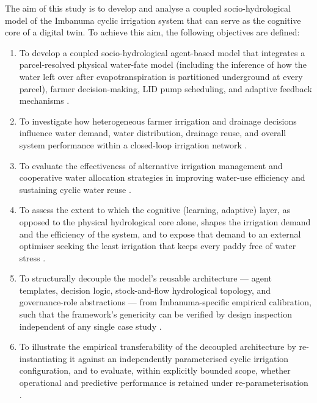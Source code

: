 \documentclass{article}
\begin{document}
\begin{changed}
The aim of this study is to develop and analyse a coupled socio-hydrological model of the Imbanuma cyclic irrigation system \cite{Okura2025WaterBalance} that can serve as the cognitive core of a digital twin. To achieve this aim, the following objectives are defined:

\begin{enumerate}
    \item To develop a coupled socio-hydrological agent-based model that integrates a parcel-resolved physical water-fate model (including the inference of how the water left over after evapotranspiration is partitioned underground at every parcel), farmer decision-making, LID pump scheduling, and adaptive feedback mechanisms \cite{Tao2019DigitalTwin, Rasheed2020DigitalTwin}.
    \item To investigate how heterogeneous farmer irrigation and drainage decisions influence water demand, water distribution, drainage reuse, and overall system performance within a closed-loop irrigation network \cite{Takeda2001Cyclic, Maruyama2008, Cao2017}.
    \item To evaluate the effectiveness of alternative irrigation management and cooperative water allocation strategies in improving water-use efficiency and sustaining cyclic water reuse \cite{Cao2017, OkuraBudiasaKato2022, Bahrami2022}.
    \item To assess the extent to which the cognitive (learning, adaptive) layer, as opposed to the physical hydrological core alone, shapes the irrigation demand and the efficiency of the system, and to expose that demand to an external optimiser seeking the least irrigation that keeps every paddy free of water stress \cite{Tao2021DigitalTwin, Verdouw2021AgricultureDT}.
    \item To structurally decouple the model's reusable architecture --- agent templates, decision logic, stock-and-flow hydrological topology, and governance-role abstractions --- from Imbanuma-specific empirical calibration, such that the framework's genericity can be verified by design inspection independent of any single case study \cite{Tao2019DigitalTwin, Verdouw2021AgricultureDT}.
    \item To illustrate the empirical transferability of the decoupled architecture by re-instantiating it against an independently parameterised cyclic irrigation configuration, and to evaluate, within explicitly bounded scope, whether operational and predictive performance is retained under re-parameterisation \cite{Jones2020DigitalTwin, Rasheed2020DigitalTwin}.
\end{enumerate}
\end{changed}
\end{document}

